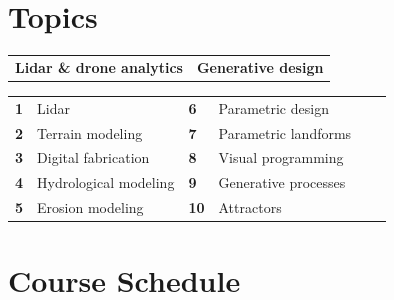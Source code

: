 \documentclass[11pt,article,oneside]{memoir}
\begin{document}

\section{Topics}
%
\begin{table}[H]
\begin{tabular}{l @{\hskip 1.25cm} l}
\textbf{Lidar \& drone analytics} & \textbf{Generative design}\\
\end{tabular}
\end{table}
%
\vspace*{-1em}
%
\begin{table}[H]
\begin{tabular}{l l l l l l}
\small
\textbf{1} & Lidar & \textbf{6} & Parametric design\\
\textbf{2} & Terrain modeling & \textbf{7} & Parametric landforms\\
\textbf{3} & Digital fabrication & \textbf{8} & Visual programming\\
\textbf{4} & Hydrological modeling & \textbf{9} & Generative processes\\
\textbf{5} & Erosion modeling & \textbf{10} & Attractors\\
\end{tabular}
\end{table}
%


\clearpage

\section{Course Schedule}
\end{document}
